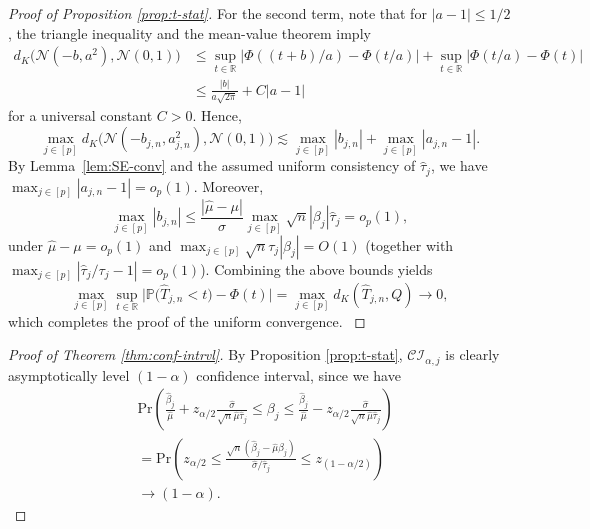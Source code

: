 \documentclass[12pt,reqno]{amsart}
\newcommand{\rbr}[1]{\left(#1\right)}
\newcommand{\R}{\mathbb{R}}
\newcommand{\pr}{\mathbb{P}}
\renewcommand{\hat}{\widehat}
\begin{document}
\begin{proof}[Proof of Proposition \ref{prop:t-stat}]
{For the second term, note that for $|a-1|\le 1/2$, the triangle inequality and the mean-value theorem imply
\begin{align}
    d_K\big(\mathcal{N}(-b,a^2), \mathcal{N}(0,1)\big)
&\le
\sup_{t\in\R}\big|\Phi((t+b)/a)-\Phi(t/a)\big|
+
\sup_{t\in\R}\big|\Phi(t/a)-\Phi(t)\big|\\
&\le
\frac{|b|}{a\sqrt{2\pi}} + C|a-1|
\end{align}
for a universal constant $C>0$.
Hence,
\[
\max_{j\in[p]} d_K\big(\mathcal{N}(-b_{j,n},a_{j,n}^2), \mathcal{N}(0,1)\big)
\lesssim
\max_{j\in[p]}|b_{j,n}|
+
\max_{j\in[p]}|a_{j,n}-1|.
\]
By Lemma~\ref{lem:SE-conv} and the assumed uniform consistency of $\hat\tau_j$,
we have $\max_{j\in[p]}|a_{j,n}-1|=o_p(1)$.
Moreover,
\[
\max_{j\in[p]}|b_{j,n}|
\le
\frac{|\hat\mu-\mu|}{\hat\sigma} 
\max_{j\in[p]}\sqrt{n} |\beta_j| \hat\tau_j
= o_p(1),
\]
under $\hat\mu-\mu=o_p(1)$ and $\max_{j\in[p]}\sqrt{n}\tau_j|\beta_j|=O(1)$ (together with $\max_{j\in[p]}|\hat\tau_j/\tau_j-1|=o_p(1)$).
Combining the above bounds yields
\[
\max_{j\in[p]}\sup_{t\in\R}\Big|\pr\Big(\hat T_{j,n}<t\Big)-\Phi(t)\Big|
=
\max_{j\in[p]} d_K(\hat T_{j,n},Q)
\to 0,
\]
which completes the proof of the uniform convergence.
}
\end{proof}

\begin{proof}[Proof of Theorem \ref{thm:conf-intrvl}]
By Proposition \ref{prop:t-stat}, $\mathcal{CI}_{\alpha,j}$ is clearly asymptotically level $(1-\alpha)$ confidence interval, since we have
\begin{align*}
    &\mathrm{Pr}\rbr{\frac{\hat{\beta}_j}{\hat{\mu}}+z_{\alpha/2}\frac{\hat{\sigma}}{\sqrt{n}\hat{\mu}\hat{\tau}_j}\le\beta_j\le\frac{\hat{\beta}_j}{\hat{\mu}}-z_{\alpha/2}\frac{\hat{\sigma}}{\sqrt{n}\hat{\mu}\hat{\tau}_j}}\\
    &=\mathrm{Pr}\rbr{z_{\alpha/2}\le\frac{\sqrt{n}(\hat{\beta}_j-\hat{\mu}\beta_j)}{\hat{\sigma}/\hat{\tau}_j}\le z_{(1-\alpha/2)}}\\
    &\to(1-\alpha).
\end{align*}
\end{proof}
\end{document}
